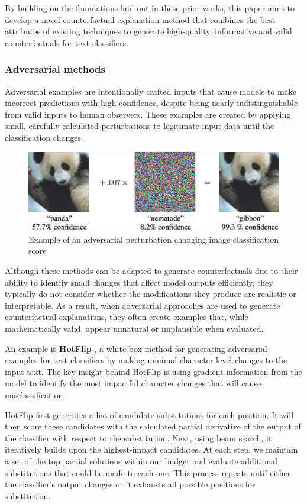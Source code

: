 By building on the foundations laid out in these prior works, this paper aims to develop a novel counterfactual explanation method that combines the best attributes of existing techniques to generate high-quality, informative and valid counterfactuals for text classifiers.
\subsubsection{Adversarial methods}
Adversarial examples are intentionally crafted inputs that cause models to make incorrect predictions with high confidence, despite being nearly indistinguishable from valid inputs to human observers. These examples are created by applying small, carefully calculated perturbations to legitimate input data until the classification changes \cite{goodfellow_explaining_2015}.

\begin{figure}[h]
    \centering
    \includegraphics[width=0.7\linewidth]{adversarial.png}
    \caption{Example of an adversarial perturbation changing image classification score \cite{goodfellow_explaining_2015}}
    \label{fig:enter-label}
\end{figure}

Although these methods can be adapted to generate counterfactuals due to their ability to identify small changes that affect model outputs efficiently, they typically do not consider whether the modifications they produce are realistic or interpretable. As a result, when adversarial approaches are used to generate counterfactual explanations, they often create examples that, while mathematically valid, appear unnatural or implausible when evaluated.

An example is \textbf{HotFlip} \cite{ebrahimi_hotflip_2018}, a white-box method for generating adversarial examples for text classifiers by making minimal character-level changes to the input text. The key insight behind HotFlip is using gradient information from the model to identify the most impactful character changes that will cause misclassification.

HotFlip first generates a list of candidate substitutions for each position. It will then score these candidates with the calculated partial derivative of the output of the classifier with respect to the substitution. Next, using beam search, it iteratively builds upon the highest-impact candidates. At each step, we maintain a set of the top partial solutions within our budget and evaluate additional substitutions that could be made to each one. This process repeats until either the classifier's output changes or it exhausts all possible positions for substitution.

